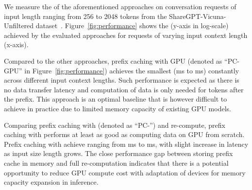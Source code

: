 We measure the \ttft of the aforementioned approaches on conversation requests of input length ranging from 256 to 2048 tokens from the ShareGPT-Vicuna-Unfiltered dataset~\cite{dataset}.
Figure~\ref{fig:performance} shows the \ttft (y-axis in log-scale) achieved by the evaluated approaches for requests of varying input context length (x-axis). 

Compared to the other approaches, prefix caching with GPU (denoted as ``PC-GPU'' in Figure~\ref{fig:performance}) achieves the smallest \ttft (ms to ms) constantly across different input context lengths. Such performance is expected as there is no data transfer latency and computation of \kv data is only needed for tokens after the prefix. 
This approach is an optimal baseline that is however difficult to achieve in practice due to limited memory capacity of existing GPU models.

Comparing prefix caching with \cxl (denoted as ``PC-\cxl'') and \kv re-compute, prefix caching with \cxl performs at least as good as computing \kv data on GPU from scratch. Prefix caching with \cxl achieve \ttft ranging from ms to ms, with slight increase in latency as input size length grows. The close performance gap between storing prefix \kv cache in \cxl memory and full \kv re-computation indicates that there is a potential opportunity to reduce GPU compute cost with adaptation of \cxl devices for memory capacity expansion in \llm inference.

